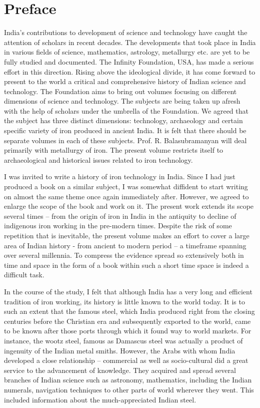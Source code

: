 \chapter*{Preface}\label{preface1}

\vspace{-1cm}

India's contributions to development of science and technology have caught the attention of scholars in recent decades. The developments that took place in India in various fields of science, mathematics, astrology, metallurgy etc. are yet to be fully studied and documented. The Infinity Foundation, USA, has made a serious effort in this direction. Rising above the ideological divide, it has come forward to present to the world a critical and comprehensive history of Indian science and technology. The Foundation aims to bring out volumes focusing on different dimensions of science and technology. The subjects are being taken up afresh with the help of scholars under the umbrella of the Foundation. We agreed that the subject has three distinct dimensions: technology, archaeology and certain specific variety of iron produced in ancient India. It is felt that there should be separate volumes in each of these subjects. Prof. R. Balasubramanyan will deal primarily with metallurgy of iron. The present volume restricts itself to archaeological and historical issues related to iron technology.

I was invited to write a history of iron technology in India. Since I had just produced a book on a similar subject, I was somewhat diffident to start writing on almost the same theme once again immediately after. However, we agreed to enlarge the scope of the book and work on it. The present work extends its scope several times – from the origin of iron in India in the antiquity to decline of indigenous iron working in the pre-modern times. Despite the risk of some repetition that is inevitable, the present volume makes an effort to cover a large area of Indian history - from ancient to modern period – a timeframe spanning over several millennia. To compress the evidence spread so extensively both in time and space in the form of a book within such a short time space is indeed a difficult task. 

\newpage

In the course of the study, I felt that although India has a very long and efficient tradition of iron working, its history is little known to the world today. It is to such an extent that the famous steel, which India produced right from the closing centuries before the Christian era and subsequently exported to the world, came to be known after those ports through which it found way to world markets. For instance, the wootz steel, famous as Damascus steel was actually a product of ingenuity of the Indian metal smiths. However, the Arabs with whom India developed a close relationship – commercial as well as socio-cultural did a great service to the advancement of knowledge. They acquired and spread several branches of Indian science such as astronomy, mathematics, including the Indian numerals, navigation techniques to other parts of world wherever they went. This included information about the much-appreciated Indian steel.

